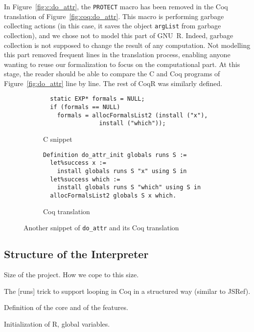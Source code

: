 \documentclass[
    sigplan,
    10pt,
    review, %
    natbib=false %
 ]{acmart}
\begin{document}
In Figure~\ref{fig:c:do_attr}, the \texttt{PROTECT} macro
has been removed in the Coq translation of Figure~\ref{fig:coq:do_attr}.
This macro is performing garbage collecting actions
(in this case, it saves the object \texttt{argList} from garbage collection),
and we chose not to model this part of GNU~R.
Indeed, garbage collection is not supposed to change the result of any computation.
Not modelling this part removed frequent lines in the translation process,
enabling anyone wanting to reuse our formalization to focus on the computational part.
%
At this stage, the reader should be able
to compare the C and Coq programs of Figure~\ref{fig:do_attr}
line by line.
The rest of CoqR was similarly defined.

\begin{figure*}
    \centering{}
\begin{subfigure}{.5\textwidth}
\begin{verbatim}
  static EXP* formals = NULL;
  if (formals == NULL)
    formals = allocFormalsList2 (install ("x"),
                install ("which"));
\end{verbatim}
    \caption{C snippet}
    \label{fig:c:do_attr:formals}
\end{subfigure}
\begin{subfigure}{.49\textwidth}
\begin{verbatim}
Definition do_attr_init globals runs S :=
  let%success x :=
    install globals runs S "x" using S in
  let%success which :=
    install globals runs S "which" using S in
  allocFormalsList2 globals S x which.
\end{verbatim}
    \caption{Coq translation}
    \label{fig:coq:do_attr:formals}
\end{subfigure}
    \caption{Another snippet of \texttt{do_attr} and its Coq translation}
    \label{fig:do_attr:formals}
\end{figure*}

\subsection{Structure of the Interpreter}
\label{sec:coq:structure}

Size of the project.
How we cope to this size.

The [runs] trick to support looping in Coq in a structured way (similar to JSRef).

Definition of the core and of the features.

Initialization of R, global variables.
\end{document}
